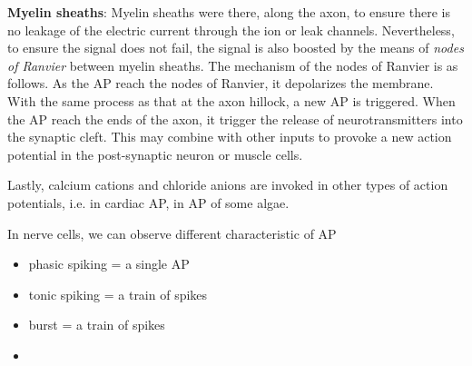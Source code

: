 {\bf Myelin sheaths}: Myelin sheaths were there, along the axon, to
ensure there is no leakage of the electric current through the ion or
leak channels. Nevertheless, to ensure the signal does not fail, the
signal is also boosted by the means of {\it nodes of Ranvier} between
myelin sheaths.  The mechanism of the nodes of Ranvier is as
follows. As the AP reach the nodes of Ranvier, it depolarizes the
membrane. With the same process as that at the axon hillock, a new AP
is triggered. When the AP reach the ends of the axon, it trigger the
release of neurotransmitters into the synaptic cleft. This may
combine with other inputs to provoke a new action potential in the
post-synaptic neuron or muscle cells.


Lastly, calcium cations and chloride anions are invoked in other types
of action potentials, i.e.  in cardiac AP,  in AP of
some algae\cite{mummert1991api}.



 

In nerve cells, we can observe different characteristic
of AP
\begin{itemize}
\item phasic spiking = a single AP
\item tonic spiking = a train of spikes
\item burst = a train of spikes
\item 
\end{itemize}

